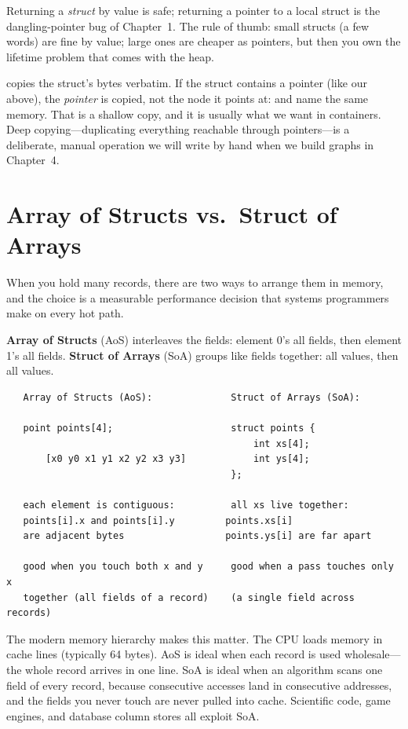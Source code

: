 Returning a \emph{struct} by value is safe; returning a pointer to a
local struct is the dangling-pointer bug of Chapter~1. The rule of
thumb: small structs (a few words) are fine by value; large ones are
cheaper as pointers, but then you own the lifetime problem that comes
with the heap.

\begin{insight}
 copies the struct's bytes verbatim. If the struct contains
a pointer (like our  above), the \emph{pointer} is copied,
not the node it points at:  and  name the
same memory. That is a shallow copy, and it is usually what we want in
containers. Deep copying---duplicating everything reachable through
pointers---is a deliberate, manual operation we will write by hand when
we build graphs in Chapter~4.
\end{insight}

\section{Array of Structs vs.\ Struct of Arrays}

When you hold many records, there are two ways to arrange them in
memory, and the choice is a measurable performance decision that
systems programmers make on every hot path.

\textbf{Array of Structs} (AoS) interleaves the fields: element 0's all
fields, then element 1's all fields. \textbf{Struct of Arrays} (SoA)
groups like fields together: all  values, then all 
values.

\begin{verbatim}
   Array of Structs (AoS):              Struct of Arrays (SoA):

   point points[4];                     struct points {
                                            int xs[4];
       [x0 y0 x1 y1 x2 y2 x3 y3]            int ys[4];
                                        };

   each element is contiguous:          all xs live together:
   points[i].x and points[i].y         points.xs[i]
   are adjacent bytes                  points.ys[i] are far apart

   good when you touch both x and y     good when a pass touches only x
   together (all fields of a record)    (a single field across records)
\end{verbatim}

The modern memory hierarchy makes this matter. The CPU loads memory in
cache lines (typically 64 bytes). AoS is ideal when each record is used
wholesale---the whole record arrives in one line. SoA is ideal when an
algorithm scans one field of every record, because consecutive accesses
land in consecutive addresses, and the fields you never touch are never
pulled into cache. Scientific code, game engines, and database column
stores all exploit SoA.


